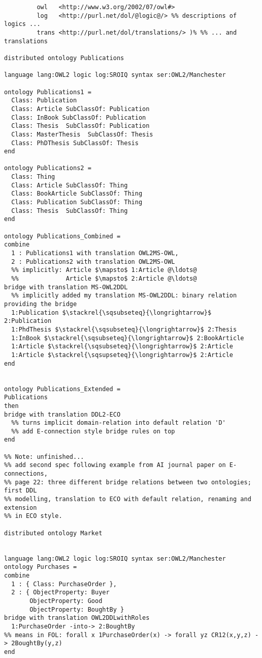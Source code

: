 \documentclass[%
\ifpretendfinal
final%
\else
draft%
\fi,
a4paper,
wd]{isov2}
\begin{document}

\begin{lstlisting}[basicstyle=\ttfamily,language=dolText,morekeywords={props,ObjectProperty,Class,DisjointUnionOf,SubClassOf,Characteristics,Transitive,Asymmetric,SubPropertyOf,DisjointClasses,EquivalentTo,inverse,only,forall,iff,if,or,exists,bridge,distributed},escapechar=@,mathescape]
%prefix( :     <http://www.example.org/mereology#>
         owl   <http://www.w3.org/2002/07/owl#>
         log   <http://purl.net/dol/@logic@/> %% descriptions of logics ...
         trans <http://purl.net/dol/translations/> )% %% ... and translations

distributed ontology Publications

language lang:OWL2 logic log:SROIQ syntax ser:OWL2/Manchester

ontology Publications1 =
  Class: Publication
  Class: Article SubClassOf: Publication
  Class: InBook SubClassOf: Publication
  Class: Thesis  SubClassOf: Publication
  Class: MasterThesis  SubClassOf: Thesis
  Class: PhDThesis SubClassOf: Thesis
end

ontology Publications2 =
  Class: Thing
  Class: Article SubClassOf: Thing
  Class: BookArticle SubClassOf: Thing
  Class: Publication SubClassOf: Thing
  Class: Thesis  SubClassOf: Thing
end

ontology Publications_Combined =
combine
  1 : Publications1 with translation OWL2MS-OWL,
  2 : Publications2 with translation OWL2MS-OWL
  %% implicitly: Article $\mapsto$ 1:Article @\ldots@
  %%             Article $\mapsto$ 2:Article @\ldots@  
bridge with translation MS-OWL2DDL
  %% implicitly added my translation MS-OWL2DDL: binary relation providing the bridge
  1:Publication $\stackrel{\sqsubseteq}{\longrightarrow}$ 2:Publication
  1:PhdThesis $\stackrel{\sqsubseteq}{\longrightarrow}$ 2:Thesis
  1:InBook $\stackrel{\sqsubseteq}{\longrightarrow}$ 2:BookArticle
  1:Article $\stackrel{\sqsubseteq}{\longrightarrow}$ 2:Article
  1:Article $\stackrel{\sqsupseteq}{\longrightarrow}$ 2:Article
end


ontology Publications_Extended =
Publications
then
bridge with translation DDL2-ECO
  %% turns implicit domain-relation into default relation 'D'
  %% add E-connection style bridge rules on top
end

%% Note: unfinished...
%% add second spec following example from AI journal paper on E-connections,
%% page 22: three different bridge relations between two ontologies; first DDL
%% modelling, translation to ECO with default relation, renaming and extension
%% in ECO style.

distributed ontology Market


language lang:OWL2 logic log:SROIQ syntax ser:OWL2/Manchester
ontology Purchases =
combine
  1 : { Class: PurchaseOrder },
  2 : { ObjectProperty: Buyer
       ObjectProperty: Good
       ObjectProperty: BoughtBy }
bridge with translation OWL2DDLwithRoles
  1:PurchaseOrder -into-> 2:BoughtBy
%% means in FOL: forall x 1PurchaseOrder(x) -> forall yz CR12(x,y,z) -> 2BoughtBy(y,z)
end


\end{lstlisting}
\end{document}
